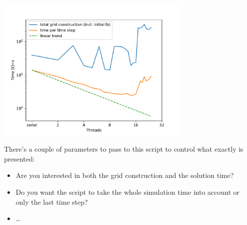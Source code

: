 \begin{center}
  \includegraphics[width=0.7\textwidth]{80_postprocessing/distributed-memory-single-experiment.pdf}
\end{center}

\noindent
There's a couple of parameters to pass to this script to control what exactly is
presented:

\begin{itemize}
  \item Are you interested in both the grid construction and the solution time?
  \item Do you want the script to take the whole simulation time into account or
  only the last time step?
  \item \ldots
\end{itemize}

